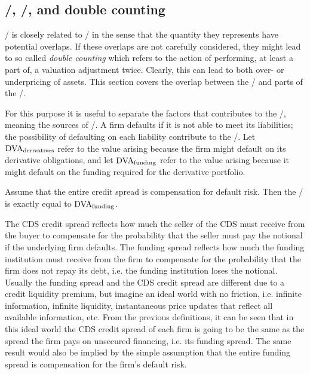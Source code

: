 \documentclass[main.tex]{subfiles}
\begin{document}
    \subsection{\FVA/, \DVA/, and double counting}
    \FVA/ is closely related to \DVA/ in the sense that the quantity they represents have potential overlaps.
    If these overlaps are not carefully considered, they might lead to so called \textit{double counting}
    which refers to the action of performing, at least a part of, a valuation adjustment twice. 
    Clearly, this can lead to both over- or underpricing of assets.
    This section covers the overlap between the \FVA/ and parts of the \DVA/.

    For this purpose it is useful to separate the factors that contributes to the \DVA/,
    meaning the sources of \DVA/. 
    A firm defaults if it is not able to meet its liabilities;
    the possibility of defaulting on each liability contribute to the \DVA/.
    Let $\DVA/_{\text{derivatives}}$ refer to the value arising
    because the firm might default on its derivative obligations,
    and let $\DVA/_{\text{funding}}$ refer to the value arising 
    because it might default on the funding required for the derivative portfolio.

    Assume that the entire credit spread is compensation for default risk.
    Then the \FBA/ is exactly equal to $\DVA/_{\text{funding}}$. 

    The CDS credit spread reflects how much the seller of the CDS must receive from the buyer
    to compensate for the probability that the seller must pay the notional if the underlying firm defaults.
    The funding spread reflects how much the funding institution must receive from the firm 
    to compensate for the probability that the firm does not repay its debt, 
    i.e. the funding institution loses the notional.
    Usually the funding spread and the CDS credit spread are different due to a credit liquidity premium,
    but imagine an ideal world with no friction, i.e. infinite information, infinite liquidity, 
    instantaneous price updates that reflect all available information, etc.
    From the previous definitions, it can be seen that in this ideal world
    the CDS credit spread of each firm is going to be the same 
    as the spread the firm pays on unsecured financing, i.e. its funding spread.
    The same result would also be implied by the simple assumption 
    that the entire funding spread is compensation for the firm's default risk.
\end{document}
